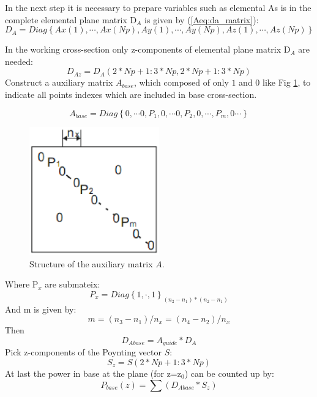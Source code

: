 In the next step it is necessary to prepare variables such as elemental 
As is in \cite{script_FeldSim} the complete elemental plane matrix D$_{A}$ is given by (\ref{Aeq:da_matrix}): 
\begin{equation}
D_{A}=Diag\left\{Ax(1),\cdots,Ax(Np),Ay(1),\cdots,Ay(Np), Az(1),\cdots,Az(Np)\right\}
\label{Aeq:da_matrix}
\end{equation}

In the working cross-section only z-components of elemental plane matrix D$_{A}$ are needed:
\begin{equation}
D_{Az}=D_{A}(2*Np+1:3*Np, 2*Np+1:3*Np)
\label{Aeq:daz_matrix}
\end{equation}
Construct a auxiliary matrix $A_{base}$, which composed of only $1$ and $0$ like Fig \ref{Afig:app_Auxiliary_matrix}, to indicate all points indexes which are included in base cross-section. 

\begin{equation}
A_{base}=Diag\left\{0,\cdots 0,P_{1},0,\cdots 0, P_{2}, 0,\cdots, P_{m}, 0\cdots\right\}
\label{Aeq:A_matrix}
\end{equation}

\begin{figure}[!ht]
\centering
\includegraphics[width=0.5\textwidth]{bilder/app_Auxiliary_matrix}
\caption{Structure of the auxiliary matrix $A$.}
\label{Afig:app_Auxiliary_matrix}
\end{figure}
Where P$_{x}$ are submateix:
\begin{equation}
P_{x}=Diag\left\{1,\cdot,1\right\}_{(n_{2}-n_{1})*(n_{2}-n_{1})}
\end{equation}
And m is given by:
\begin{equation}
m=(n_{3}-n_{1})/n_{x}=(n_{4}-n_{2})/n_{x}
\end{equation}
Then 
\begin{equation}
D_{Abase}=A_{guide}*D_{A}
\end{equation}
Pick z-components of the Poynting vector $S$:
\begin{equation}
S_{z}=S(2*Np+1:3*Np)
\end{equation}
At last the power in base at the plane (for z=z$_{0}$) can be counted up by:
\begin{equation}
P_{base}(z)=\sum(D_{Abase}*S_{z})
\end{equation}

